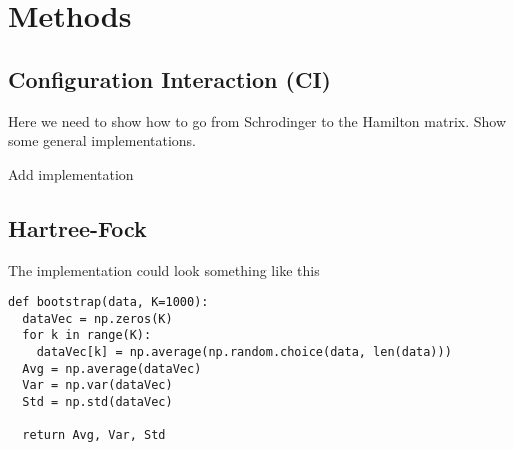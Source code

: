 \section{Methods} \label{sec:methods}

\subsection{Configuration Interaction (CI)}
Here we need to show how to go from Schrodinger to the Hamilton matrix. Show some general implementations.

Add implementation

\subsection{Hartree-Fock}


The implementation could look something like this
\lstset{basicstyle=\scriptsize}
\begin{lstlisting}
def bootstrap(data, K=1000):
  dataVec = np.zeros(K)
  for k in range(K):
    dataVec[k] = np.average(np.random.choice(data, len(data)))
  Avg = np.average(dataVec)
  Var = np.var(dataVec)
  Std = np.std(dataVec)
    
  return Avg, Var, Std
\end{lstlisting}
